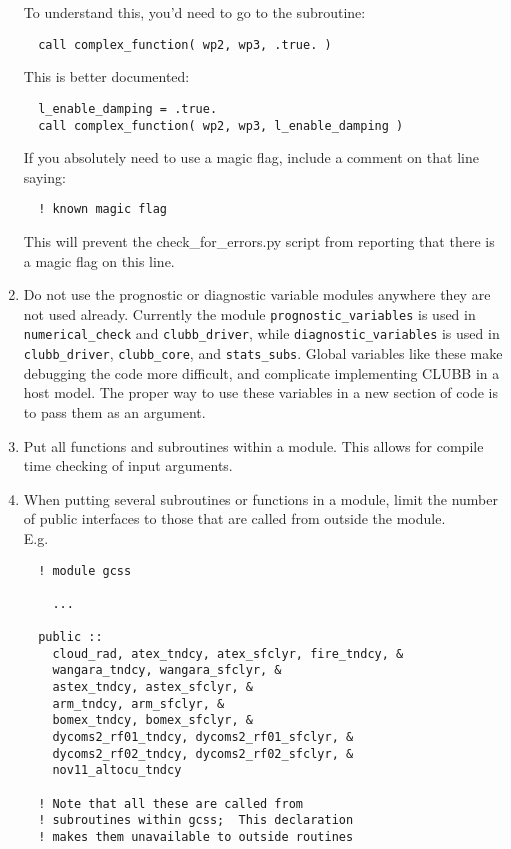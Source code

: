 \documentclass[letterpaper,12pt]{article}
\begin{document}
\begin{enumerate}
To understand this, you'd need to go to the subroutine: 
\begin{verbatim}
  call complex_function( wp2, wp3, .true. ) 
\end{verbatim}

This is better documented:
\begin{verbatim}
  l_enable_damping = .true.
  call complex_function( wp2, wp3, l_enable_damping )
\end{verbatim}

If you absolutely need to use a magic flag, include a comment on that line
saying:
\begin{verbatim}
  ! known magic flag
\end{verbatim}
This will prevent the check\_for\_errors.py script from reporting that there is a
magic flag on this line.

\item Do not use the prognostic or diagnostic variable modules anywhere they
are not used already.  Currently the module \texttt{prognostic\_variables} 
is used in 
\texttt{numerical\_check} and \texttt{clubb\_driver}, while 
\texttt{diagnostic\_variables} is used in \texttt{clubb\_driver}, 
\texttt{clubb\_core}, 
and \texttt{stats\_subs}. Global variables like these make debugging 
the code more difficult, and complicate implementing CLUBB in a host model.
The proper way to use these variables in a new section of code is to pass them as an argument.
\newline

\item Put all functions and subroutines within a module.  This allows for 
compile time checking of input arguments. \newline

\item When putting several subroutines or functions in a module, limit the
 number of public interfaces to those that are called from outside the 
 module.\\
E.g. 
\begin{verbatim}
  ! module gcss

    ...

  public ::
    cloud_rad, atex_tndcy, atex_sfclyr, fire_tndcy, &
    wangara_tndcy, wangara_sfclyr, &
    astex_tndcy, astex_sfclyr, &
    arm_tndcy, arm_sfclyr, &
    bomex_tndcy, bomex_sfclyr, &
    dycoms2_rf01_tndcy, dycoms2_rf01_sfclyr, &
    dycoms2_rf02_tndcy, dycoms2_rf02_sfclyr, &
    nov11_altocu_tndcy 

  ! Note that all these are called from 
  ! subroutines within gcss;  This declaration
  ! makes them unavailable to outside routines


\end{verbatim}
\end{enumerate}
\end{document}
